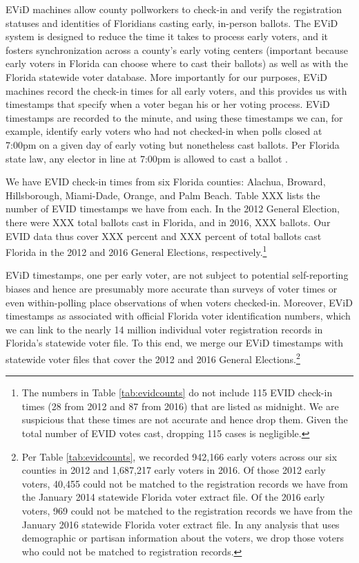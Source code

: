 \documentclass[12pt,titlepage]{article}
\begin{document}

EViD machines allow county pollworkers to check-in and verify the
registration statuses and identities of Floridians casting early,
in-person ballots. The EViD system is designed to reduce the time it
takes to process early voters, and it fosters synchronization across a
county's early voting centers (important because early voters in
Florida can choose where to cast their ballots) as well as with the
Florida statewide voter database.  More importantly for our purposes,
EViD machines record the check-in times for all early voters, and this
provides us with timestamps that specify when a voter began his or her
voting process. EViD timestamps are recorded to the minute, and using
these timestamps we can, for example, identify early voters who had
not checked-in when polls closed at 7:00pm on a given day of early
voting but nonetheless cast ballots.  Per Florida state law, any
elector in line at 7:00pm is allowed to cast a ballot
\citet{FLStatutes:7pm}.

We have EVID check-in times from six Florida counties: Alachua,
Broward, Hillsborough, Miami-Dade, Orange, and Palm Beach.  Table XXX
lists the number of EVID timestamps we have from each.  In the 2012
General Election, there were XXX total ballots cast in Florida, and in
2016, XXX ballots.  Our EVID data thus cover XXX percent and XXX
percent of total ballots cast Florida in the 2012 and 2016 General
Elections, respectively.\footnote{The numbers in Table
  \ref{tab:evidcounts} do not include 115 EVID check-in times (28 from
  2012 and 87 from 2016) that are listed as midnight.  We are
  suspicious that these times are not accurate and hence drop them.
  Given the total number of EVID votes cast, dropping 115 cases is
  negligible.}



EViD timestamps, one per early voter, are not subject to potential
self-reporting biases and hence are presumably more accurate than
surveys of voter times or even within-polling place observations of
when voters checked-in.  Moreover, EViD timestamps as associated with
official Florida voter identification numbers, which we can link to
the nearly 14 million individual voter registration records in
Florida's statewide voter file.  To this end, we merge our EViD
timestamps with statewide voter files that cover the 2012 and 2016
General Elections.\footnote{Per Table \ref{tab:evidcounts}, we
  recorded 942,166 early voters across our six counties in 2012 and
  1,687,217 early voters in 2016.  Of those 2012 early voters, 40,455
  could not be matched to the registration records we have from the
  January 2014 statewide Florida voter extract file.  Of the 2016
  early voters, 969 could not be matched to the registration records
  we have from the January 2016 statewide Florida voter extract file.
  In any analysis that uses demographic or partisan information about
  the voters, we drop those voters who could not be matched to
  registration records.}
\end{document}
